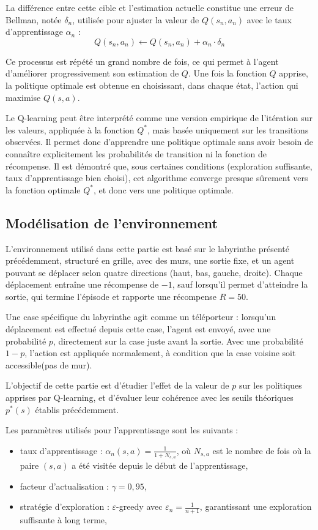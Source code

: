 \documentclass[12pt]{article}
\begin{document}
La différence entre cette cible et l’estimation actuelle constitue une erreur de Bellman, notée \(\delta_n\), utilisée pour ajuster la valeur de \(Q(s_n, a_n)\) avec le taux d’apprentissage \(\alpha_n\) :
\[
Q(s_n, a_n) \leftarrow Q(s_n, a_n) + \alpha_n \cdot \delta_n
\]

Ce processus est répété un grand nombre de fois, ce qui permet à l’agent d’améliorer progressivement son estimation de \(Q\). Une fois la fonction \(Q\) apprise, la politique optimale est obtenue en choisissant, dans chaque état, l’action qui maximise \(Q(s,a)\).


Le Q-learning peut être interprété comme une version empirique de l’itération sur les valeurs, appliquée à la fonction \(Q^*\), mais basée uniquement sur les transitions  observées. Il permet donc d’apprendre une politique optimale sans avoir besoin de connaître explicitement les probabilités de transition ni la fonction de récompense.
 Il est démontré que, sous certaines conditions (exploration suffisante, taux d’apprentissage bien choisi), cet algorithme converge presque sûrement vers la fonction optimale \(Q^*\), et donc vers une politique optimale.


\subsection{Modélisation de l’environnement}

L’environnement utilisé dans cette partie est basé sur le labyrinthe présenté précédemment, structuré en grille, avec des murs, une sortie fixe, et un agent pouvant se déplacer selon quatre directions (haut, bas, gauche, droite). Chaque déplacement entraîne une récompense de \(-1\), sauf lorsqu’il permet d’atteindre la sortie, qui termine l’épisode et rapporte une récompense \( R = 50 \).

Une case spécifique du labyrinthe agit comme un téléporteur : lorsqu’un déplacement est effectué depuis cette case, l’agent est envoyé, avec une probabilité \( p \), directement sur la case juste avant la sortie. Avec une probabilité \( 1 - p \), l’action est appliquée normalement, à condition que la case voisine soit accessible(pas de mur).

L’objectif de cette partie est d’étudier l’effet de la valeur de \( p \) sur les politiques apprises par Q-learning, et d’évaluer leur cohérence avec les seuils théoriques \( p^*(s) \) établis précédemment.

Les paramètres utilisés pour l’apprentissage sont les suivants :
\begin{itemize}
    \item taux d’apprentissage : \( \alpha_n(s,a) = \frac{1}{1 + N_{s,a}} \), où \( N_{s,a} \) est le nombre de fois où la paire \((s,a)\) a été visitée depuis le début de l’apprentissage,
    \item facteur d’actualisation : \( \gamma = 0{,}95 \),
    \item stratégie d’exploration : \(\varepsilon\)-greedy avec \( \varepsilon_n = \frac{1}{n + 1} \), garantissant une exploration suffisante à long terme,
\end{itemize}
\end{document}
